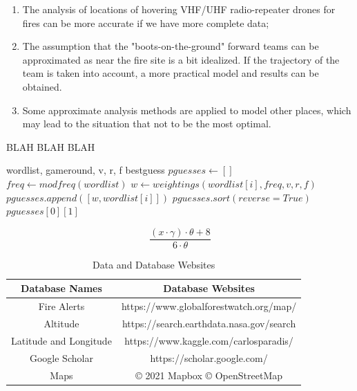 \documentclass[12pt]{article}  %
\begin{document}
\begin{enumerate}[\bfseries 1.]
    \setlength{\parsep}{0ex} %
    \setlength{\topsep}{0ex} %
    \setlength{\itemsep}{0ex} %
    \item The analysis of locations of hovering VHF/UHF radio-repeater drones for fires can be more accurate if we have more complete data;
    \item The assumption that the "boots-on-the-ground" forward teams can be approximated as near the fire site is a bit idealized. If the trajectory of the team is taken into account, a more practical model and results can be obtained.
    \item Some approximate analysis methods are applied to model other places, which may lead to the situation that not to be the most optimal.
\end{enumerate}

\begin{algorithm}
	\caption{BLAH BLAH BLAH}
	\begin{algorithmic}[1] %
		\REQUIRE wordlist, gameround, v, r, f
		\ENSURE bestguess
		\STATE $pguesses \gets []$
		\STATE $freq \gets modfreq(wordlist)$
		\STATE $w \gets weightings(wordlist[i], freq, v, r, f)$
		\STATE $pguesses.append([w, wordlist[i]])$
		\ENDFOR
		\STATE $pguesses.sort(reverse = True)$
		\RETURN $pguesses[0][1]$
	\end{algorithmic}
\end{algorithm}

\[ \frac{{(x \cdot \gamma) \cdot \theta + 8}}{{6 \cdot \theta}} \tag{1}\]


\begin{table}[htbp]
	\begin{center}
		\caption{Data and Database Websites}
		\resizebox{\textwidth}{!}
		{\begin{tabular}{c c}
				\toprule[2pt]
				\multicolumn{1}{m{5cm}}{\centering \textbf{Database Names}}
				&\multicolumn{1}{m{10cm}}{\centering \textbf{Database Websites} }\\ %
				\midrule
				Fire Alerts& https://www.globalforestwatch.org/map/ \\
				Altitude & https://search.earthdata.nasa.gov/search \\
				Latitude and Longitude & https://www.kaggle.com/carlosparadis/\\ 
				Google Scholar & https://scholar.google.com/ \\
				Maps& \copyright{} 2021 Mapbox \copyright{} OpenStreetMap\\
				\bottomrule[2pt]
		\end{tabular}}
	\end{center}
\end{table}
\end{document}
